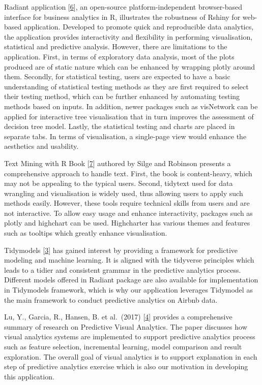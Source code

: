 \documentclass{acm_proc_article-sp}
\begin{document}
Radiant application {[}\protect\hyperlink{ref-radiant2019}{6}{]}, an
open-source platform-independent browser-based interface for business
analytics in R, illustrates the robustness of Rshiny for web-based
application. Developed to promote quick and reproducible data analytics,
the application provides interactivity and flexibility in performing
visualisation, statistical and predictive analysis. However, there are
limitations to the application. First, in terms of exploratory data
analysis, most of the plots produced are of static nature which can be
enhanced by wrapping plotly around them. Secondly, for statistical
testing, users are expected to have a basic understanding of statistical
testing methods as they are first required to select their testing
method, which can be further enhanced by automating testing methods
based on inputs. In addition, newer packages such as visNetwork can be
applied for interactive tree visualisation that in turn improves the
assessment of decision tree model. Lastly, the statistical testing and
charts are placed in separate tabs. In terms of visualisation, a
single-page view would enhance the aesthetics and usability.

Text Mining with R Book {[}\protect\hyperlink{ref-robinson}{7}{]}
authored by Silge and Robinson presents a comprehensive approach to
handle text. First, the book is content-heavy, which may not be
appealing to the typical users. Second, tidytext used for data wrangling
and visualisation is widely used, thus allowing users to apply such
methods easily. However, these tools require technical skills from users
and are not interactive. To allow easy usage and enhance interactivity,
packages such as plotly and highchart can be used. Highcharter has
various themes and features such as tooltips which greatly enhance
visualisation.

Tidymodels {[}\protect\hyperlink{ref-tidymodels2020}{3}{]} has gained
interest by providing a framework for predictive modeling and machine
learning. It is aligned with the tidyverse principles which leads to a
tidier and consistent grammar in the predictive analytics process.
Different models offered in Radiant package are also available for
implementation in Tidymodels framework, which is why our application
leverages Tidymodel as the main framework to conduct predictive
analytics on Airbnb data.

Lu, Y., Garcia, R., Hansen, B. et al.~(2017)
{[}\protect\hyperlink{ref-https:ux2fux2fdoi.orgux2f10.1111ux2fcgf.13210}{4}{]}
provides a comprehensive summary of research on Predictive Visual
Analytics. The paper discusses how visual analytics systems are
implemented to support predictive analytics process such as feature
selection, incremental learning, model comparison and result
exploration. The overall goal of visual analytics is to support
explanation in each step of predictive analytics exercise which is also
our motivation in developing this application.
\end{document}
